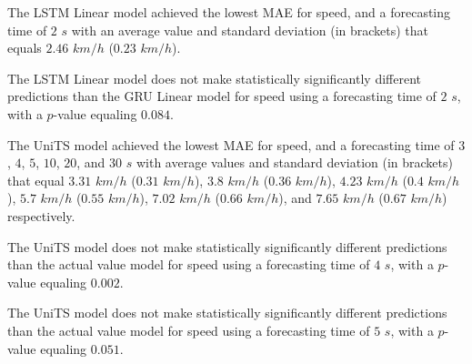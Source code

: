 The LSTM Linear model achieved the lowest MAE for speed, and a forecasting time of $2$ $s$ with an average value and standard deviation (in brackets) that equals $2.46$ $km/h$ ($0.23$ $km/h$).

The LSTM Linear model does not make statistically significantly different predictions than the GRU Linear model for speed using a forecasting time of $2$ $s$, with a $p$-value equaling $0.084$.

The UniTS model achieved the lowest MAE for speed, and a forecasting time of $3$, $4$, $5$, $10$, $20$, and $30$ $s$ with average values and standard deviation (in brackets) that equal $3.31$ $km/h$ ($0.31$ $km/h$), $3.8$ $km/h$ ($0.36$ $km/h$), $4.23$ $km/h$ ($0.4$ $km/h$), $5.7$ $km/h$ ($0.55$ $km/h$), $7.02$ $km/h$ ($0.66$ $km/h$), and $7.65$ $km/h$ ($0.67$ $km/h$) respectively.

The UniTS model does not make statistically significantly different predictions than the actual value model for speed using a forecasting time of $4$ $s$, with a $p$-value equaling $0.002$.

The UniTS model does not make statistically significantly different predictions than the actual value model for speed using a forecasting time of $5$ $s$, with a $p$-value equaling $0.051$.

